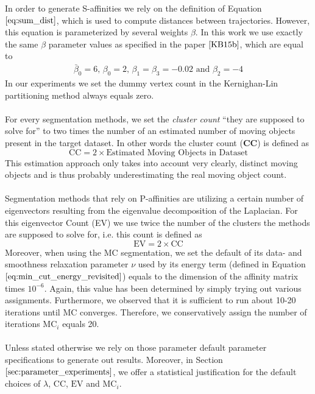 In order to generate S-affinities we rely on the definition of Equation $\ref{eq:sum_dist}$, which is used to compute distances between trajectories. However, this equation is parameterized by several weights $\beta$. In this work we use exactly the same $\beta$ parameter values as specified in the paper $\cite{KB15b}$, which are equal to
\begin{equation}
\begin{aligned}
\bar{\beta}_0 = 6 \text{, } \beta_0 = 2 \text{, } \beta_1 = \beta_3 = -0.02 \text{ and } \beta_2 = -4
\end{aligned}
\end{equation}
In our experiments we set the dummy vertex count in the Kernighan-Lin partitioning method always equals zero. \\ \\
For every segmentation methods, we set the \textit{cluster count} \enquote{they are supposed to solve for} to two times the number of an estimated number of moving objects present in the target dataset. In other words the cluster count (\textbf{CC}) is defined as
\begin{equation}
	\text{CC} = 2 \times \text{Estimated Moving Objects in Dataset}
\label{eq:cc_def} 
\end{equation}
This estimation approach only takes into account very clearly, distinct moving objects and is thus probably underestimating the real moving object count. \\ \\
Segmentation methods that rely on P-affinities are utilizing a certain number of eigenvectors resulting from the eigenvalue decomposition of the Laplacian. For this eigenvector Count (EV) we use twice the number of the clusters the methods are supposed to solve for, i.e. this count is defined as
\begin{equation}
	\text{EV} = 2 \times \text{CC}
\end{equation}
Moreover, when using the MC segmentation, we set the default of its data- and smoothness relaxation parameter $\nu$ used by its energy term (defined in Equation $\ref{eq:min_cut_energy_revisited}$) equals to the dimension of the affinity matrix times $10^{-6}$. Again, this value has been determined by simply trying out various assignments. Furthermore, we observed that it is sufficient to run about 10-20 iterations until MC converges. Therefore, we conservatively assign the number of iterations $\text{MC}_i$ equals 20. \\ \\
Unless stated otherwise we rely on those parameter default parameter specifications to generate out results. Moreover, in Section $\ref{sec:parameter_experiments}$, we offer a statistical justification for the default choices of $\lambda$, $\text{CC}$, $\text{EV}$ and $\text{MC}_i$.

